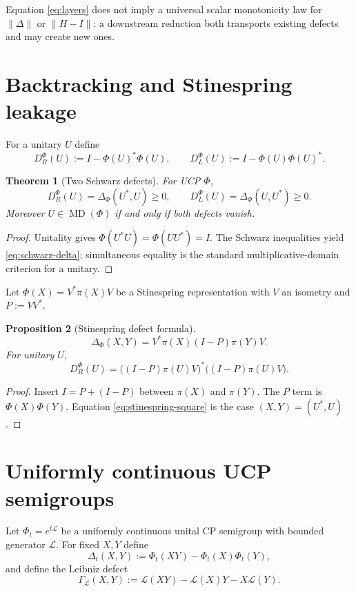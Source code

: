 \documentclass[11pt]{article}
\newtheorem{theorem}{Theorem}[section]
\newtheorem{proposition}[theorem]{Proposition}
\theoremstyle{definition}
\theoremstyle{remark}
\newcommand{\MD}{\operatorname{MD}}
\begin{document}
Equation \eqref{eq:layers} does not imply a universal scalar monotonicity law for $\|\Delta\|$ or $\|H-I\|$: a downstream reduction both transports existing defects and may create new ones.

\section{Backtracking and Stinespring leakage}
For a unitary $U$ define
\begin{equation}\label{eq:schwarz-defects}
D_R^\Phi(U):=I-\Phi(U)^*\Phi(U),\qquad
D_L^\Phi(U):=I-\Phi(U)\Phi(U)^*.
\end{equation}

\begin{theorem}[Two Schwarz defects]\label{thm:schwarz}
For UCP $\Phi$,
\begin{equation}\label{eq:schwarz-delta}
D_R^\Phi(U)=\Delta_\Phi(U^*,U)\ge0,\qquad
D_L^\Phi(U)=\Delta_\Phi(U,U^*)\ge0.
\end{equation}
Moreover $U\in\MD(\Phi)$ if and only if both defects vanish.
\end{theorem}
\begin{proof}
Unitality gives $\Phi(U^*U)=\Phi(UU^*)=I$. The Schwarz inequalities yield \eqref{eq:schwarz-delta}; simultaneous equality is the standard multiplicative-domain criterion for a unitary.
\end{proof}

Let $\Phi(X)=V^*\pi(X)V$ be a Stinespring representation with $V$ an isometry and $P:=VV^*$.

\begin{proposition}[Stinespring defect formula]\label{prop:stinespring}
\begin{equation}\label{eq:stinespring}
\Delta_\Phi(X,Y)=V^*\pi(X)(I-P)\pi(Y)V.
\end{equation}
For unitary $U$,
\begin{equation}\label{eq:stinespring-square}
D_R^\Phi(U)=\bigl((I-P)\pi(U)V\bigr)^*\bigl((I-P)\pi(U)V\bigr).
\end{equation}
\end{proposition}
\begin{proof}
Insert $I=P+(I-P)$ between $\pi(X)$ and $\pi(Y)$. The $P$ term is $\Phi(X)\Phi(Y)$. Equation \eqref{eq:stinespring-square} is the case $(X,Y)=(U^*,U)$.
\end{proof}

\section{Uniformly continuous UCP semigroups}
Let $\Phi_t=e^{t\mathcal L}$ be a uniformly continuous unital CP semigroup with bounded generator $\mathcal L$. For fixed $X,Y$ define
\[
\Delta_t(X,Y):=\Phi_t(XY)-\Phi_t(X)\Phi_t(Y),
\]
and define the Leibniz defect
\begin{equation}\label{eq:gamma}
\Gamma_{\mathcal L}(X,Y):=\mathcal L(XY)-\mathcal L(X)Y-X\mathcal L(Y).
\end{equation}
\end{document}
